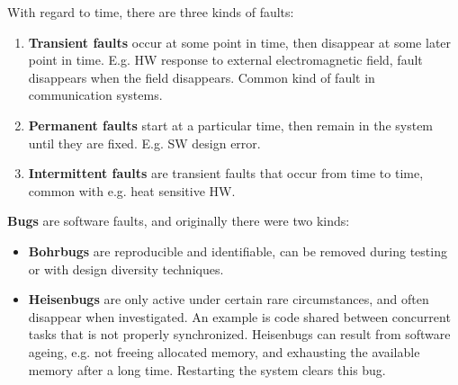 With regard to time, there are three kinds of faults:
\begin{enumerate}
    \item \textbf{Transient faults} occur at some point in time, then disappear at some later point in time. E.g. HW response to external electromagnetic field, fault disappears when the field disappears. Common kind of fault in communication systems.
    \item \textbf{Permanent faults} start at a particular time, then remain in the system until they are fixed. E.g. SW design error.
    \item \textbf{Intermittent faults} are transient faults that occur from time to time, common with e.g. heat sensitive HW.
\end{enumerate}
\textbf{Bugs} are software faults, and originally there were two kinds:
\begin{itemize}
    \item \textbf{Bohrbugs} are reproducible and identifiable, can be removed during testing or with design diversity techniques.
    \item \textbf{Heisenbugs} are only active under certain rare circumstances, and often disappear when investigated. An example is code shared between concurrent tasks that is not properly synchronized. Heisenbugs can result from software ageing, e.g. not freeing allocated memory, and exhausting the available memory after a long time. Restarting the system clears this bug.
\end{itemize}

